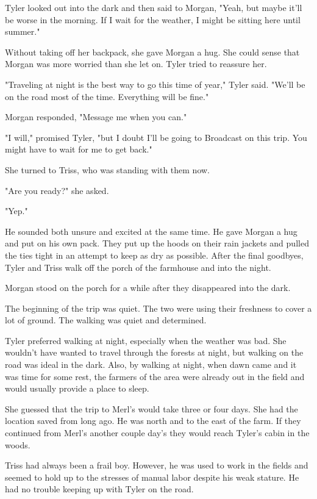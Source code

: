 \documentclass[courier]{sffms}
\begin{document}
Tyler looked out into the dark and then said to
Morgan, "Yeah, but maybe it'll be worse in the
morning. If I wait for the weather, I might be
sitting here until summer."

Without taking off her backpack, she gave
Morgan a hug. She could sense that Morgan
was more worried than she let on. Tyler
tried to reassure her.

"Traveling at night is the best way to go this
time of year," Tyler said. "We'll be on the road
most of the time. Everything will be fine."

Morgan responded, "Message me when you can."

"I will," promised Tyler, "but I doubt I'll be going
to Broadcast on this trip. You might have to wait
for me to get back."

She turned to Triss, who was standing with them
now.

"Are you ready?" she asked.

"Yep."

He sounded both unsure and excited at the
same time. He gave Morgan a hug and put on his
own pack. They put up the hoods on their 
rain jackets and pulled the ties tight in an
attempt to keep as dry as possible. After the
final goodbyes, Tyler and Triss walk off the
porch of the farmhouse and into the night.

Morgan stood on the porch for a while after
they disappeared into the dark.

The beginning of the trip was quiet. The two
were using their freshness to cover a lot of 
ground. The walking was quiet and determined.

Tyler preferred walking at night, especially when
the weather was bad. She wouldn't have wanted
to travel through the forests at night, but walking
on the road was ideal in the dark. Also, by
walking at night, when dawn came and it was 
time for some rest, the farmers of the area were
already out in the field and would usually provide
a place to sleep.

She guessed that the trip to Merl's would take
three or four days. She had the location saved
from long ago. He was north and to the east
of the farm. If they continued from Merl's another
couple day's they would reach Tyler's cabin in the
woods.

Triss had always been a frail boy. However, he
was used to work in the fields and seemed to
hold up to the stresses of manual labor despite
his weak stature. He had no trouble keeping up
with Tyler on the road.
\end{document}
